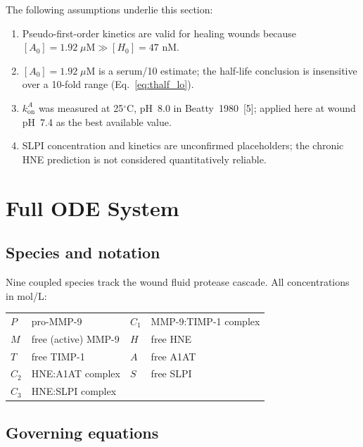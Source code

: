\documentclass[10pt,a4paper]{article}
\numberwithin{equation}{section}
\newcommand{\kon}{k_{\text{on}}}
\newcommand{\cit}[1]{[#1]}   %
\begin{document}
The following assumptions underlie this section:

\begin{enumerate}[noitemsep]
  \item Pseudo-first-order kinetics are valid for healing wounds because
    $[A_0] = 1.92\;\mu\text{M} \gg [H_0] = 47$ nM.
  \item $[A_0] = 1.92\;\mu\text{M}$ is a serum/10 estimate; the half-life
    conclusion is insensitive over a 10-fold range (Eq.~\eqref{eq:thalf_lo}).
  \item $\kon^A$ was measured at 25$^{\circ}$C, pH~8.0 in Beatty~1980~\cit{5};
    applied here at wound pH~7.4 as the best available value.
  \item SLPI concentration and kinetics are unconfirmed placeholders; the chronic
    HNE prediction is not considered quantitatively reliable.
\end{enumerate}

\section{Full ODE System}
\label{sec:ode}

\subsection{Species and notation}

Nine coupled species track the wound fluid protease cascade. All concentrations in mol/L:

\begin{center}
\small\renewcommand{\arraystretch}{1.15}
\begin{tabular}{@{}ll@{\quad}ll@{}}
$P$ & pro-MMP-9         & $C_1$ & MMP-9:TIMP-1 complex \\
$M$ & free (active) MMP-9 & $H$   & free HNE \\
$T$ & free TIMP-1        & $A$   & free A1AT \\
$C_2$ & HNE:A1AT complex & $S$   & free SLPI \\
$C_3$ & HNE:SLPI complex &       & \\
\end{tabular}
\end{center}

\subsection{Governing equations}
\end{document}
